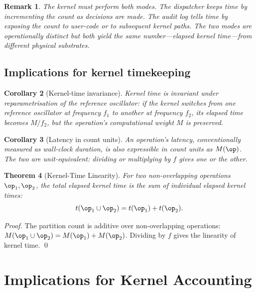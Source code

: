 \documentclass[twocolumn,11pt,a4paper]{article}
\newtheorem{theorem}{Theorem}[section]
\newtheorem{corollary}[theorem]{Corollary}
\newtheorem{remark}[theorem]{Remark}
\newcommand{\Mcount}{M}
\begin{document}
\begin{remark}
The kernel must perform both modes. The dispatcher \emph{keeps} time by incrementing the count as decisions are made. The audit log \emph{tells} time by exposing the count to user-code or to subsequent kernel paths. The two modes are operationally distinct but both yield the same number---elapsed kernel time---from different physical substrates.
\end{remark}

\subsection{Implications for kernel timekeeping}

\begin{corollary}[Kernel-time invariance]
\label{cor:invariance}
Kernel time is invariant under reparametrisation of the reference oscillator: if the kernel switches from one reference oscillator at frequency $f_1$ to another at frequency $f_2$, its elapsed time becomes $\Mcount/f_2$, but the operation's computational weight $\Mcount$ is preserved.
\end{corollary}

\begin{corollary}[Latency in count units]
\label{cor:latency-count}
An operation's latency, conventionally measured as wall-clock duration, is also expressible in count units as $\Mcount(\op)$. The two are unit-equivalent: dividing or multiplying by $f$ gives one or the other.
\end{corollary}

\begin{theorem}[Kernel-Time Linearity]
\label{thm:linearity}
For two non-overlapping operations $\op_1, \op_2$, the total elapsed kernel time is the sum of individual elapsed kernel times:
\[
t(\op_1 \cup \op_2) = t(\op_1) + t(\op_2).
\]
\end{theorem}

\begin{proof}
The partition count is additive over non-overlapping operations: $\Mcount(\op_1 \cup \op_2) = \Mcount(\op_1) + \Mcount(\op_2)$. Dividing by $f$ gives the linearity of kernel time. \qed
\end{proof}

\section{Implications for Kernel Accounting}
\label{sec:timekeeping}
\end{document}
